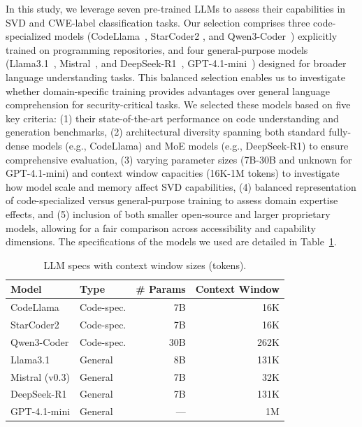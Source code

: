 \documentclass[lettersize,journal]{IEEEtran}
\begin{document}
In this study, we leverage seven pre-trained \glspl{LLM} to assess their capabilities in \gls{SVD} and CWE-label classification tasks. Our selection comprises three code-specialized models (CodeLlama~\cite{roziere2023code}, StarCoder2 \cite{lozhkov2024starcoder}, and Qwen3-Coder~\cite{yang2025qwen3}) explicitly trained on programming repositories, and four general-purpose models (Llama3.1~\cite{dubey2024llama}, Mistral~\cite{jiang2023mistral7b}, and DeepSeek-R1~\cite{guo2025deepseek}, GPT-4.1-mini~\cite{openai2025gpt4_1mini}) designed for broader language understanding tasks. This balanced selection enables us to investigate whether domain-specific training provides advantages over general language comprehension for security-critical tasks. We selected these models based on five key criteria: (1) their state-of-the-art performance on code understanding and generation benchmarks, (2) architectural diversity spanning both standard fully-dense models (e.g., CodeLlama) and \gls{MoE} models (e.g., DeepSeek-R1) to ensure comprehensive evaluation, (3) varying parameter sizes (7B-30B and unknown for GPT-4.1-mini) and context window capacities (16K-1M tokens) to investigate how model scale and memory affect \gls{SVD} capabilities, (4) balanced representation of code-specialized versus general-purpose training to assess domain expertise effects, and (5) inclusion of both smaller open-source and larger proprietary models, allowing for a fair comparison across accessibility and capability dimensions. The specifications of the models we used are detailed in Table~\ref{table:llm-specs}.

\begin{table}[!t]
\centering
\caption{LLM specs with context window sizes (tokens).}
\label{table:llm-specs}
\footnotesize
\setlength{\tabcolsep}{6pt}
\renewcommand{\arraystretch}{1.1}
\begin{tabular}{@{}l l r r@{}}
\toprule
\textbf{Model} & \textbf{Type} & \textbf{\# Params} & \textbf{Context Window} \\
\midrule
CodeLlama & Code-spec. & 7B & 16K \\
StarCoder2 & Code-spec. & 7B & 16K \\
Qwen3-Coder & Code-spec. & 30B & 262K \\
Llama3.1 & General & 8B & 131K \\
Mistral (v0.3) & General & 7B & 32K \\
DeepSeek-R1 & General & 7B & 131K \\
GPT-4.1-mini & General & --- & 1M \\
\bottomrule
\end{tabular}
\end{table}
\end{document}
